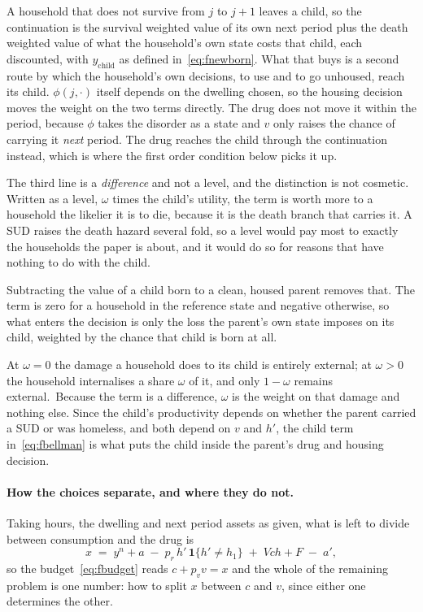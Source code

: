 \documentclass[10pt]{article}
\begin{document}
A
household that does not survive from $j$ to $j+1$ leaves a child, so the
continuation is the survival weighted value of its own next period plus the death
weighted value of what the household's own state costs that child,
each discounted, with $y_{\text{child}}$
as defined in~\eqref{eq:fnewborn}. What that buys is a second route by
which the household's own decisions, to use and to go unhoused, reach its child.
$\phi(j,\cdot)$ itself depends on the dwelling chosen, so the housing
decision moves the weight on the two terms directly. The drug does not move it
within the period, because $\phi$ takes the disorder as a state and $v$ only raises
the chance of carrying it \emph{next} period. The drug reaches the child through the
continuation instead, which is where the first order condition below picks it up.

The third line is a \emph{difference} and not a level, and the
distinction is not cosmetic. Written as a level, $\omega$ times the child's
utility, the term is worth more to a household the likelier it is to die,
because it is the death branch that carries it. A SUD raises the death hazard
several fold, so a level would pay most to exactly the households the paper is
about, and it would do so for reasons that have nothing to do with the child.

Subtracting the value of a child born to a clean, housed parent removes that. The
term is zero for a household in the reference state and negative otherwise, so
what enters the decision is only the loss the parent's own state imposes on its
child, weighted by the chance that child is born at all.

At $\omega=0$ the damage a household does to its child is entirely
external; at
$\omega>0$ the household internalises a share $\omega$ of it, and only $1-\omega$
remains external.\ Because the term is a difference, $\omega$ is the
weight on that damage and nothing else. Since the child's productivity depends on whether the parent
carried a SUD or was homeless, and both depend on $v$ and $h'$, the child
term in~\eqref{eq:fbellman} is
what puts the child inside the parent's drug and housing decision.

\paragraph{How the choices separate, and where they do not.}
Taking hours, the dwelling and next
period assets as given, what is left to divide
between consumption and the drug is
\begin{equation}\label{eq:fresource}
x\;=\;y^{n}+a\;-\;p_r\,h'\,\mathbf{1}\{h'\neq h_1\}\;+\;V\!ch+F\;-\;a' ,
\end{equation}
so the budget~\eqref{eq:fbudget} reads $c+p_v v=x$ and the whole of the
remaining problem is one number: how to split $x$ between $c$ and $v$, since
either one determines the other.
\end{document}
